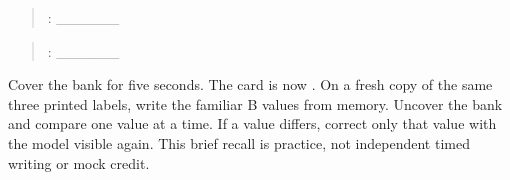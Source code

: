 \begin{quote}
: \_\_\_\_\_\_
\end{quote}

\begin{quote}
: \_\_\_\_\_\_
\end{quote}

\begin{tcolorbox}[breakable,colback=teal!4,colframe=teal!35!black,title={Before you move on}]
Cover the bank for five seconds. The card is now \textbf{}. On a fresh copy of the same three printed labels, write the familiar B values from memory. Uncover the bank and compare one value at a time. If a value differs, correct only that value with the model visible again. This brief recall is practice, not independent timed writing or mock credit.
\end{tcolorbox}
